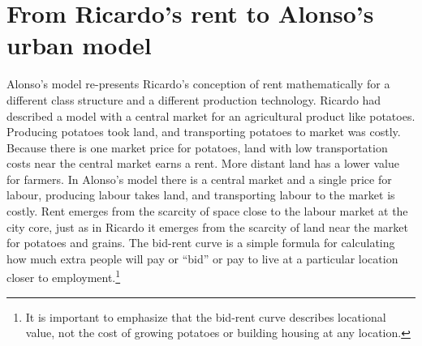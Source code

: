 \section{From Ricardo's rent to Alonso's urban model}

Alonso's model re-presents Ricardo's conception of rent mathematically for a different class structure and a different production technology. Ricardo had described a model with a central market for an agricultural product like potatoes. Producing potatoes took land, and transporting potatoes to market was costly. Because there is one market price for potatoes, land with low transportation costs near the central market earns a rent. More distant land has a lower value for farmers. In Alonso's model there is a central market and a single price for labour, producing labour takes land, and transporting labour to the market is costly. Rent emerges from the scarcity of space close to the labour market at the city core, just as in Ricardo it emerges from the scarcity of land near the market for potatoes and grains. The \gls{bid-rent curve} is a simple formula for calculating how much extra people will pay or ``bid'' or pay to live at a particular location closer to employment.\footnote{It is important to emphasize that the bid-rent curve describes locational value, not the cost of growing potatoes or building housing at any location.}   

